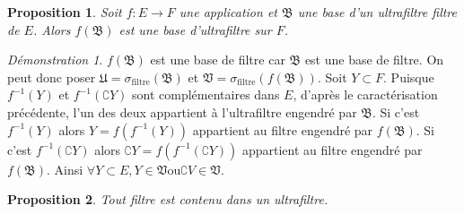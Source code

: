 \documentclass[a4paper, 11pt, french]{book}
\theoremstyle{plain} %
\newtheorem{proposition}{Proposition}
\theoremstyle{definition} %
\theoremstyle{remark} %
\newtheorem*{demonstration}{Démonstration}
\newcommand{\1}{\mathds{1}}
\newcommand{\inv}[1]{#1^{-1}}
\newcommand{\ou}{\mathrel{\mathrm{ou}}}
\renewcommand{\frak}[1]{\mathfrak{#1}}
\renewcommand{\rm}[1]{\mathrm{#1}}
\begin{document}
\begin{proposition}
	Soit $f:E\rightarrow F$ une application et $\frak{B}$ une base d'un ultrafiltre filtre de $E$.
	Alors $f(\frak{B})$ est une base d'ultrafiltre sur $F$.
\end{proposition}

\begin{demonstration}
	$f(\frak{B})$ est une base de filtre car $\frak{B}$ est une base de filtre.
	On peut donc poser $\frak{U}=\sigma_\rm{filtre}(\frak{B})$ et $\frak{V}=\sigma_\rm{filtre}(f(\frak{B}))$.
	Soit $Y\subset F$.
	Puisque $\inv{f}(Y)$ et $\inv{f}(\complement Y)$ sont complémentaires dans $E$, d'après le caractérisation précédente, l'un des deux appartient à l'ultrafiltre engendré par $\frak{B}$.
	Si c'est $\inv{f}(Y)$ alors $Y=f(\inv{f}(Y))$ appartient au filtre engendré par $f(\frak{B})$.
	Si c'est $\inv{f}(\complement Y)$ alors $\complement Y=f(\inv{f}(\complement Y))$ appartient au filtre engendré par $f(\frak{B})$.
	Ainsi $\forall Y\subset E, Y\in\frak{V}\ou\complement V\in\frak{V}$.
\end{demonstration}

\begin{proposition}
	Tout filtre est contenu dans un ultrafiltre.
\end{proposition}
\end{document}
